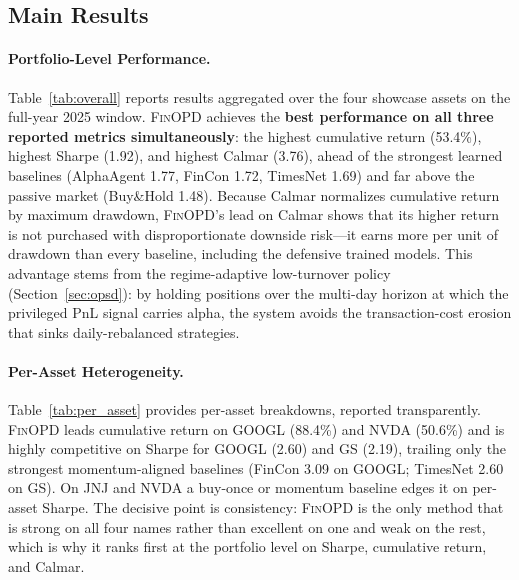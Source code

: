 \subsection{Main Results}



\paragraph{Portfolio-Level Performance.} Table~\ref{tab:overall} reports results aggregated over the four showcase assets on the full-year 2025 window. \textsc{FinOPD} achieves the \textbf{best performance on all three reported metrics simultaneously}: the highest cumulative return (53.4\%), highest Sharpe (1.92), and highest Calmar (3.76), ahead of the strongest learned baselines (AlphaAgent 1.77, FinCon 1.72, TimesNet 1.69) and far above the passive market (Buy\&Hold 1.48). Because Calmar normalizes cumulative return by maximum drawdown, \textsc{FinOPD}'s lead on Calmar shows that its higher return is not purchased with disproportionate downside risk---it earns more per unit of drawdown than every baseline, including the defensive trained models. This advantage stems from the regime-adaptive low-turnover policy (Section~\ref{sec:opsd}): by holding positions over the multi-day horizon at which the privileged PnL signal carries alpha, the system avoids the transaction-cost erosion that sinks daily-rebalanced strategies.



\paragraph{Per-Asset Heterogeneity.} Table~\ref{tab:per_asset} provides per-asset breakdowns, reported transparently. \textsc{FinOPD} leads cumulative return on GOOGL (88.4\%) and NVDA (50.6\%) and is highly competitive on Sharpe for GOOGL (2.60) and GS (2.19), trailing only the strongest momentum-aligned baselines (FinCon 3.09 on GOOGL; TimesNet 2.60 on GS). On JNJ and NVDA a buy-once or momentum baseline edges it on per-asset Sharpe. The decisive point is consistency: \textsc{FinOPD} is the only method that is strong on all four names rather than excellent on one and weak on the rest, which is why it ranks first at the portfolio level on Sharpe, cumulative return, and Calmar.

